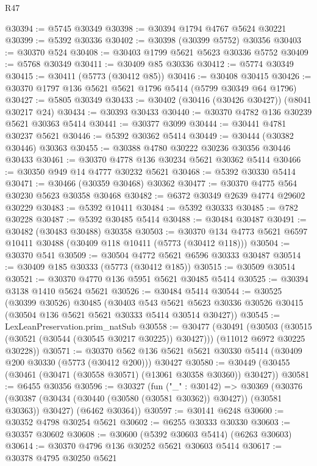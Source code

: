 \begin{lexlean}{R47}
\begin{coremodule}
@30394 := @5745 @30349
@30398 := @30394 @1794 @4767 @5624 @30221
@30399 := @5392 @30336
@30402 := @30398 (@30399 @5752) @30356
@30403 := @30370 @524
@30408 := @30403 @1799 @5621 @5623 @30336 @5752
@30409 := @5768 @30349
@30411 := @30409 @85 @30336
@30412 := @5774 @30349
@30415 := @30411 (@5773 (@30412 @85))
@30416 := @30408 @30415
@30426 := @30370 @1797 @136 @5621 @5621 @1796 @5414 (@5799 @30349 @64 @1796)
@30427 := @5805 @30349
@30433 := @30402 (@30416 (@30426 @30427)) (@8041 @30217 @24)
@30434 := @30393 @30433
@30440 := @30370 @4782 @136 @30239 @5621 @30363 @5414
@30441 := @30377 @3099
@30444 := @30441 @4781 @30237 @5621
@30446 := @5392 @30362 @5414
@30449 := @30444 (@30382 @30446) @30363
@30455 := @30388 @4780 @30222 @30236 @30356 @30446 @30433
@30461 := @30370 @4778 @136 @30234 @5621 @30362 @5414
@30466 := @30350 @949 @14 @4777 @30232 @5621
@30468 := @5392 @30330 @5414
@30471 := @30466 (@30359 @30468) @30362
@30477 := @30370 @4775 @564 @30230 @5623 @30358 @30468
@30482 := @6372 @30349 @2639 @4774 @29602 @30229
@30483 := @5392 @10411
@30484 := @5392 @30333
@30485 := @782 @30228
@30487 := @5392 @30485 @5414
@30488 := @30484 @30487
@30491 := @30482 (@30483 @30488) @30358
@30503 := @30370 @134 @4773 @5621 @6597 @10411 @30488 (@30409 @118 @10411 (@5773 (@30412 @118)))
@30504 := @30370 @541
@30509 := @30504 @4772 @5621 @6596 @30333 @30487
@30514 := @30409 @185 @30333 (@5773 (@30412 @185))
@30515 := @30509 @30514
@30521 := @30370 @4770 @136 @5951 @5621 @30485 @5414
@30525 := @30394 @3138 @1410 @5624 @5621
@30526 := @30484 @5414
@30544 := @30525
    (@30399 @30526)
    @30485
    (@30403
      @543
      @5621
      @5623
      @30336
      @30526
      @30415
      (@30504 @136 @5621 @5621 @30333 @5414 @30514 @30427))
@30545 := LexLeanPreservation.prim_natSub
@30558 := @30477
    (@30491
      (@30503 (@30515 (@30521 (@30544 (@30545 @30217 @30225)) @30427)))
      (@11012 @6972 @30225 @30228))
@30571 := @30370
    @562
    @136
    @5621
    @5621
    @30330
    @5414
    (@30409 @200 @30330 (@5773 (@30412 @200)))
    @30427
@30580 := @30449 (@30455 (@30461 (@30471 (@30558 @30571) (@13061 @30358 @30360)) @30427))
@30581 := @6455 @30356
@30596 := @30327
    (fun ("_" : @30142) =>
    @30369
      (@30376 (@30387 (@30434 (@30440 (@30580 (@30581 @30362)) @30427)) (@30581 @30363)) @30427)
      (@6462 @30364))
@30597 := @30141 @6248
@30600 := @30352 @4798 @30254 @5621
@30602 := @6255 @30333 @30330
@30603 := @30357 @30602
@30608 := @30600 (@5392 @30603 @5414) (@6263 @30603)
@30614 := @30370 @4796 @136 @30252 @5621 @30603 @5414
@30617 := @30378 @4795 @30250 @5621

\end{coremodule}
\end{lexlean}
